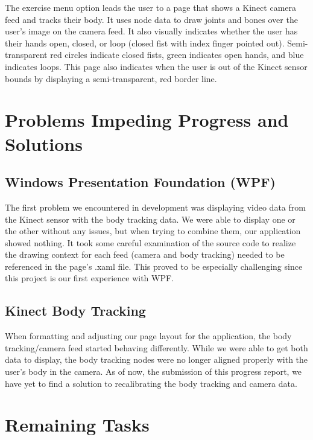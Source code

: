 \documentclass[onecolumn, draftclsnofoot,10pt, compsoc]{IEEEtran}
\begin{document}
The exercise menu option leads the user to a page that shows a Kinect camera feed and tracks their body. It uses node data to draw joints and bones over the user's image on the camera feed. It also visually indicates whether the user has their hands open, closed, or  loop (closed fist with index finger pointed out). Semi-transparent red circles indicate closed fists, green indicates open hands, and blue indicates loops. This page also indicates when the user is out of the Kinect sensor bounds by displaying a semi-transparent, red border line. 

\section{Problems Impeding Progress and Solutions}
\subsection{Windows Presentation Foundation (WPF)}
The first problem we encountered in development was displaying video data from the Kinect sensor with the body tracking data. We were able to display one or the other without any issues, but when trying to combine them, our application showed nothing. It took some careful examination of the source code to realize the drawing context for each feed (camera and body tracking) needed to be referenced in the page's .xaml file. This proved to be especially challenging since this project is our first experience with WPF.
\subsection{Kinect Body Tracking}
When formatting and adjusting our page layout for the application, the body tracking/camera feed started behaving differently. While we were able to get both data to display, the body tracking nodes were no longer aligned properly with the user's body in the camera. As of now, the submission of this progress report, we have yet to find a solution to recalibrating the body tracking and camera data.

\section{Remaining Tasks}
\end{document}
